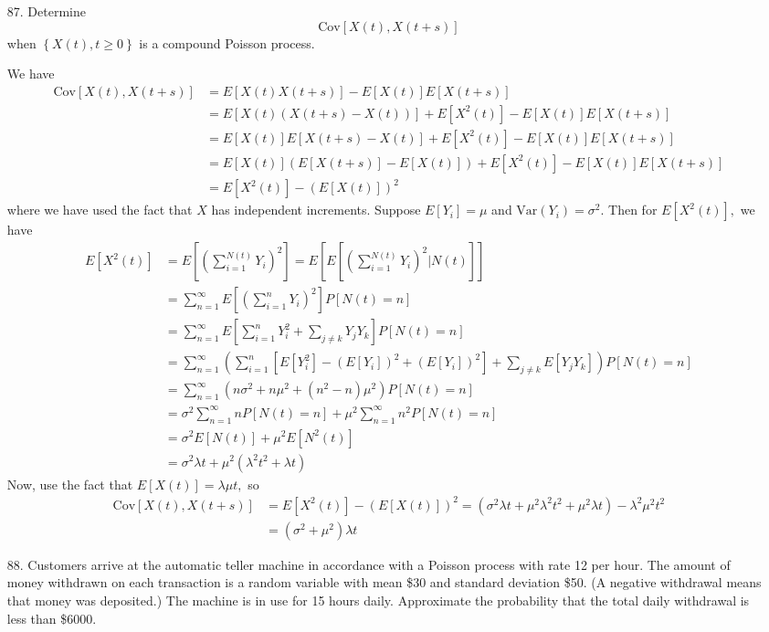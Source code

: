 \documentclass{article}
\newcommand{\var}{\mathrm{Var}}
\newcommand{\cov}{\mathrm{Cov}}
\begin{document}
\begin{itemize}
	\item[87.] Determine
		\[\cov\left[ X(t), X(t+s) \right]\]
		when $\left\{ X(t), t\ge0 \right\}$ is a compound Poisson process.
		\begin{soln}
			We have
			\begin{align*}
				\cov\left[ X(t), X(t+s) \right] &= E\left[ X(t) X(t+s) \right] - E\left[ X(t) \right]E\left[ X(t+s) \right] \\
				&= E\left[ X(t) \left( X(t+s)-X(t) \right) \right] + E\left[ X^2(t) \right] - E[X(t)]E[X(t+s)] \\
				&= E[X(t)] E[X(t+s)-X(t)] + E[X^2(t)] - E[X(t)]E[X(t+s)] \\
				&= E[X(t)] \left( E[X(t+s)] - E[X(t)] \right) + E[X^2(t)] - E[X(t)]E[X(t+s)] \\
				&= E[X^2(t)] - \left( E[X(t)] \right)^2
			\end{align*}
			where we have used the fact that $X$ has independent increments. Suppose $E[Y_i] = \mu$ and $\var(Y_i)=\sigma^2.$ Then for $E[X^2(t)],$ we have
			\begin{align*}
				E[X^2(t)] &= E\left[ \left( \sum_{i=1}^{N(t)} Y_i \right)^2 \right] = E\left[ E\left[ \left( \sum_{i=1}^{N(t)} Y_i\right)^2\bigg\vert N(t) \right] \right] \\
				&= \sum_{n=1}^{\infty} E\left[ \left(\sum_{i=1}^{n} Y_i\right)^2 \right] P[N(t)=n] \\
				&= \sum_{n=1}^{\infty} E\left[ \sum_{i=1}^{n} Y_i^2 + \sum_{j\neq k}^{} Y_j Y_k \right] P[N(t)=n] \\
				&= \sum_{n=1}^{\infty} \left( \sum_{i=1}^{n} \left[E[Y_i^2] - (E[Y_i])^2 + (E[Y_i])^2\right] + \sum_{j\neq k}^{} E[Y_j Y_k] \right) P[N(t)=n] \\
				&= \sum_{n=1}^{\infty} \left( n\sigma^2 + n\mu^2 + (n^2-n)\mu^2 \right) P[N(t)=n] \\
				&= \sigma^2 \sum_{n=1}^{\infty} nP[N(t)=n] + \mu^2\sum_{n=1}^{\infty} n^2 P[N(t)=n] \\
				&= \sigma^2 E[N(t)] + \mu^2 E[N^2(t)] \\
				&= \sigma^2\lambda t+ \mu^2(\lambda^2t^2+\lambda t)
			\end{align*}
			Now, use the fact that $E[X(t)] = \lambda \mu t,$ so
			\begin{align*}
				\cov[X(t), X(t+s)] &= E[X^2(t)] - \left( E[X(t)] \right)^2 = (\sigma^2\lambda t + \mu^2\lambda^2t^2+\mu^2\lambda t) - \lambda^2\mu^2t^2 \\
				&= \boxed{(\sigma^2+\mu^2) \lambda t}
			\end{align*}
		\end{soln}

	\item[88.] Customers arrive at the automatic teller machine in accordance with a Poisson process with rate 12 per hour. The amount of money withdrawn on each transaction is a random variable with mean \$30 and standard deviation \$50. (A negative withdrawal means that money was deposited.) The machine is in use for 15 hours daily. Approximate the probability that the total daily withdrawal is less than \$6000.
		
\end{itemize}
\end{document}
